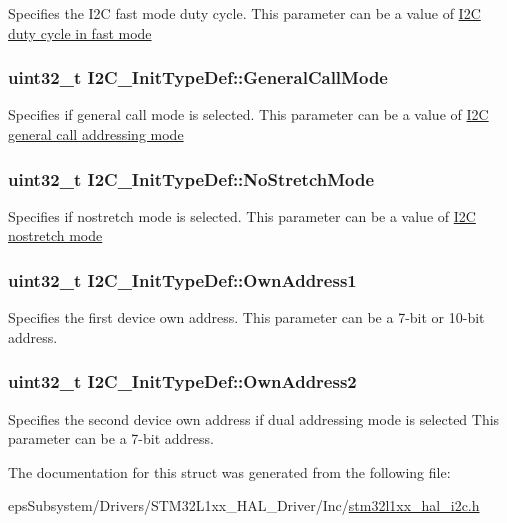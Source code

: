 Specifies the I2\-C fast mode duty cycle. This parameter can be a value of \hyperlink{group___i2_c__duty__cycle__in__fast__mode}{I2\-C duty cycle in fast mode} \hypertarget{struct_i2_c___init_type_def_a17ce92b135a4b5c045a5387c91677803}{
\subsubsection[{General\-Call\-Mode}]{\setlength{\rightskip}{0pt plus 5cm}uint32\-\_\-t I2\-C\-\_\-\-Init\-Type\-Def\-::\-General\-Call\-Mode}}\label{struct_i2_c___init_type_def_a17ce92b135a4b5c045a5387c91677803}
Specifies if general call mode is selected. This parameter can be a value of \hyperlink{group___i2_c__general__call__addressing__mode}{I2\-C general call addressing mode} \hypertarget{struct_i2_c___init_type_def_a28afdce458703464638f1a01e04da04e}{
\subsubsection[{No\-Stretch\-Mode}]{\setlength{\rightskip}{0pt plus 5cm}uint32\-\_\-t I2\-C\-\_\-\-Init\-Type\-Def\-::\-No\-Stretch\-Mode}}\label{struct_i2_c___init_type_def_a28afdce458703464638f1a01e04da04e}
Specifies if nostretch mode is selected. This parameter can be a value of \hyperlink{group___i2_c__nostretch__mode}{I2\-C nostretch mode} \hypertarget{struct_i2_c___init_type_def_abfb610317ea08e85c8feece82ccc9e16}{
\subsubsection[{Own\-Address1}]{\setlength{\rightskip}{0pt plus 5cm}uint32\-\_\-t I2\-C\-\_\-\-Init\-Type\-Def\-::\-Own\-Address1}}\label{struct_i2_c___init_type_def_abfb610317ea08e85c8feece82ccc9e16}
Specifies the first device own address. This parameter can be a 7-\/bit or 10-\/bit address. \hypertarget{struct_i2_c___init_type_def_a8165caf61b7b52f903edd7517ddaa06b}{
\subsubsection[{Own\-Address2}]{\setlength{\rightskip}{0pt plus 5cm}uint32\-\_\-t I2\-C\-\_\-\-Init\-Type\-Def\-::\-Own\-Address2}}\label{struct_i2_c___init_type_def_a8165caf61b7b52f903edd7517ddaa06b}
Specifies the second device own address if dual addressing mode is selected This parameter can be a 7-\/bit address. 

The documentation for this struct was generated from the following file\-:\begin{DoxyCompactItemize}
\item 
eps\-Subsystem/\-Drivers/\-S\-T\-M32\-L1xx\-\_\-\-H\-A\-L\-\_\-\-Driver/\-Inc/\hyperlink{stm32l1xx__hal__i2c_8h}{stm32l1xx\-\_\-hal\-\_\-i2c.\-h}\end{DoxyCompactItemize}
